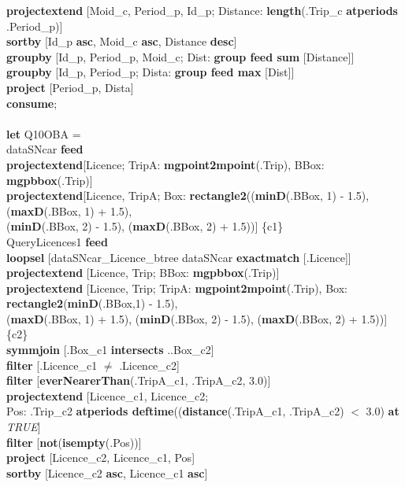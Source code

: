 \documentclass[a4paper]{article}
\newcommand{\op}[1]{\textbf{#1}}
\newcommand{\true}{\textsl{TRUE}}
\begin{document}
\begin{scriptsize}
\begin{tabbing}
\>\op{projectextend} [Moid\_c, Period\_p, Id\_p; Distance: \op{length}(.Trip\_c \op{atperiods} .Period\_p)]\\
\>\op{sortby} [Id\_p \op{asc}, Moid\_c \op{asc}, Distance \op{desc}]\\
\>\op{groupby} [Id\_p, Period\_p, Moid\_c; Dist: \op{group feed sum} [Distance]]\\
\>\op{groupby} [Id\_p, Period\_p; Dista: \op{group feed max} [Dist]]\\
\>\op{project} [Period\_p, Dista]\\
\op{consume};\\
\\
\op{let} Q10OBA =\\
\>dataSNcar \op{feed}\\
\>\>\op{projectextend}[Licence; TripA: \op{mgpoint2mpoint}(.Trip), BBox: \op{mgpbbox}(.Trip)]\\
\>\>\op{projectextend}[Licence, TripA; Box: \op{rectangle2}((\op{minD}(.BBox, 1) - 1.5), (\op{maxD}(.BBox, 1) + 1.5),\\
\>\>\>\>(\op{minD}(.BBox, 2) - 1.5), (\op{maxD}(.BBox, 2) + 1.5))] \{c1\}\\
\>QueryLicences1 \op{feed}\\
\>\>\op{loopsel} [dataSNcar\_Licence\_btree dataSNcar \op{exactmatch} [.Licence]]\\
\>\>\op{projectextend} [Licence, Trip;  BBox: \op{mgpbbox}(.Trip)]\\
\>\>\op{projectextend} [Licence, Trip; TripA: \op{mgpoint2mpoint}(.Trip), Box: \op{rectangle2}(\op{minD}(.BBox,1) - 1.5),\\
\>\>\>\>(\op{maxD}(.BBox, 1) + 1.5), (\op{minD}(.BBox, 2) - 1.5), (\op{maxD}(.BBox, 2) + 1.5))] \{c2\}\\
\>\op{symmjoin} [.Box\_c1 \op{intersects} ..Box\_c2]\\
\>\op{filter} [.Licence\_c1 $\neq$ .Licence\_c2]\\
\>\op{filter} [\op{everNearerThan}(.TripA\_c1, .TripA\_c2, 3.0)]\\
\>\op{projectextend} [Licence\_c1, Licence\_c2; \\
\>\>\>\>Pos: .Trip\_c2 \op{atperiods deftime}((\op{distance}(.TripA\_c1, .TripA\_c2) $<$ 3.0) \op{at} \true{}]\\
\>\op{filter} [\op{not}(\op{isempty}(.Pos))]\\
\>\op{project} [Licence\_c2, Licence\_c1, Pos]\\
\>\op{sortby} [Licence\_c2 \op{asc}, Licence\_c1 \op{asc}]\\

\end{tabbing}
\end{scriptsize}
\end{document}
